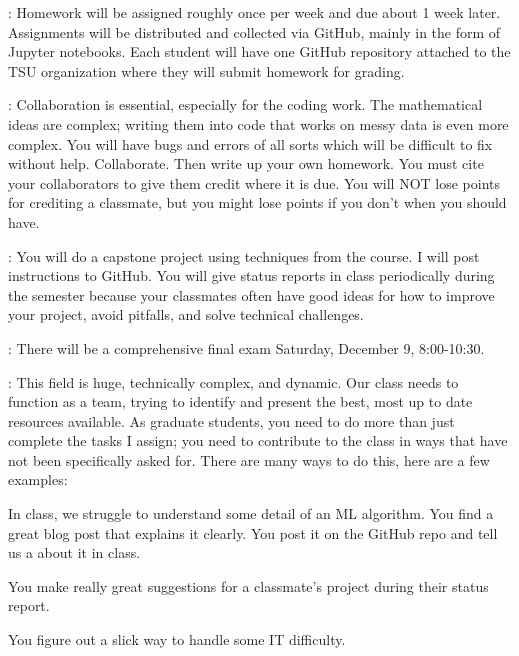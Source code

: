 \documentclass[letterpaper]{article}
\begin{document}
\bu[Homework]: Homework will be assigned roughly once per week and due about 1 week later.  Assignments will be distributed and collected via GitHub, mainly in the form of Jupyter notebooks.  Each student will have one GitHub repository attached to the TSU organization where they will submit homework for grading.

\bu[Collaboration]: Collaboration is essential, especially for the coding work.  The mathematical ideas are complex; writing them into code that works on messy data is even more complex.  You will have bugs and errors of all sorts which will be difficult to fix without help.  Collaborate.  Then write up your own homework.  You must cite your collaborators to give them credit where it is due.  You will NOT lose points for crediting a classmate, but you might lose points if you don't when you should have.

\bu[Project]: You will do a capstone project using techniques from the course.  I will post instructions to GitHub.  You will give status reports in class periodically during the semester because your classmates often have good ideas for how to improve your project, avoid pitfalls, and solve technical challenges.

\bu[Exams]: There will be a comprehensive final exam Saturday, December 9, 8:00-10:30.

\bu[Contributions]: This field is huge, technically complex, and dynamic.  Our class needs to function as a team, trying to identify and present the best, most up to date resources available.  As graduate students, you need to do more than just complete the tasks I assign; you need to contribute to the class in ways that have not been specifically asked for.  There are many ways to do this, here are a few examples:
\bit
	\item In class, we struggle to understand some detail of an ML algorithm.  You find a great blog post that explains it clearly.  You post it on the GitHub repo and tell us a about it in class.
	\item You make really great suggestions for a classmate's project during their status report.
	\item You figure out a slick way to handle some IT difficulty.
\eit
\end{document}
